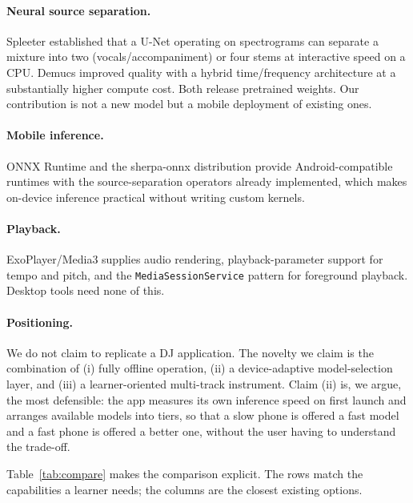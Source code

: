 \documentclass[letterpaper]{article} %
\begin{document}
\paragraph{Neural source separation.} Spleeter \citep{hennequin2020spleeter}
established that a U-Net operating on spectrograms can separate a mixture into
two (vocals/accompaniment) or four stems at interactive speed on a CPU. Demucs
\citep{rouard2023demucs} improved quality with a hybrid time/frequency
architecture at a substantially higher compute cost. Both release pretrained
weights. Our contribution is not a new model but a mobile deployment of
existing ones.

\paragraph{Mobile inference.} ONNX Runtime
\citep{onnxruntime} and the sherpa-onnx distribution \citep{sherpaonnx} provide
Android-compatible runtimes with the source-separation operators already
implemented, which makes on-device inference practical without writing custom
kernels.

\paragraph{Playback.} ExoPlayer/Media3 \citep{media3} supplies audio
rendering, playback-parameter support for tempo and pitch, and the
\texttt{Media\-Session\-Service} pattern for foreground playback. Desktop
tools need none of this.

\paragraph{Positioning.} We do not claim to replicate a DJ application. The
novelty we claim is the combination of (i) fully offline operation, (ii) a
device-adaptive model-selection layer, and (iii) a learner-oriented multi-track
instrument. Claim (ii) is, we argue, the most defensible: the app measures its
own inference speed on first launch and arranges available models into tiers,
so that a slow phone is offered a fast model and a fast phone is offered a
better one, without the user having to understand the trade-off.

Table~\ref{tab:compare} makes the comparison explicit. The rows match the
capabilities a learner needs; the columns are the closest existing options.
\end{document}
